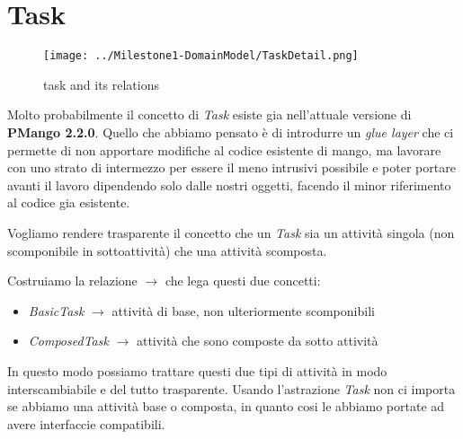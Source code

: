 \section{Task}
\label{sec:task}

\begin{figure}[h!] 
	\centering
	\texttt{[image: ../Milestone1-DomainModel/TaskDetail.png]}
	\caption{task and its relations}
	\label{fig:task} 
\end{figure}

Molto probabilmente il concetto di \emph{Task} esiste gia nell'attuale
versione di \textbf{PMango 2.2.0}. Quello che abbiamo pensato \`e di introdurre
un \emph{glue layer} che ci permette di non apportare modifiche al codice
esistente di mango, ma lavorare con uno strato di intermezzo per essere il meno
intrusivi possibile e poter portare avanti il lavoro dipendendo solo dalle
nostri oggetti, facendo il minor riferimento al codice gia esistente.

Vogliamo rendere trasparente il concetto che un \emph{Task} sia un attivit\`a
singola (non scomponibile in sottoattivit\`a) che una attivit\`a scomposta. 

Costruiamo la relazione $\rightarrow$ che lega questi due concetti:
\begin{itemize}
  \item \emph{BasicTask} $\rightarrow$ attivit\`a di base, non ulteriormente
  scomponibili
  \item \emph{ComposedTask} $\rightarrow$ attivit\`a che sono composte da sotto
  attivit\`a
\end{itemize}
In questo modo possiamo trattare questi due tipi di attivit\`a in modo
interscambiabile e del tutto trasparente. Usando l'astrazione \emph{Task} non
ci importa se abbiamo una attivit\`a base o composta, in quanto cosi le abbiamo
portate ad avere interfaccie compatibili.
